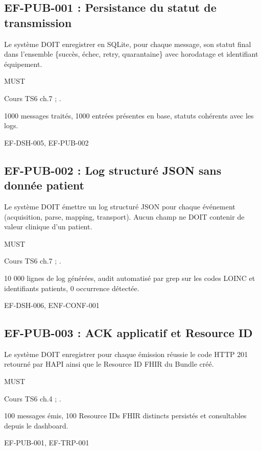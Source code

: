 \subsection*{EF-PUB-001 : Persistance du statut de transmission}
\begin{description}[leftmargin=2.5cm, style=nextline]
  \item[Énoncé] Le système DOIT enregistrer en SQLite, pour chaque message, son statut final dans l'ensemble \{succès, échec, retry, quarantaine\} avec horodatage et identifiant équipement.
  \item[Priorité] MUST
  \item[Source] Cours TS6 ch.7 ; \cite{ihe_pcd_tf}.
  \item[Recette] 1000 messages traités, 1000 entrées présentes en base, statuts cohérents avec les logs.
  \item[Lié à] EF-DSH-005, EF-PUB-002
\end{description}

\subsection*{EF-PUB-002 : Log structuré JSON sans donnée patient}
\begin{description}[leftmargin=2.5cm, style=nextline]
  \item[Énoncé] Le système DOIT émettre un log structuré JSON pour chaque événement (acquisition, parse, mapping, transport). Aucun champ ne DOIT contenir de valeur clinique d'un patient.
  \item[Priorité] MUST
  \item[Source] Cours TS6 ch.7 ; \cite{ihe_pcd_tf}.
  \item[Recette] 10 000 lignes de log générées, audit automatisé par grep sur les codes LOINC et identifiants patients, 0 occurrence détectée.
  \item[Lié à] EF-DSH-006, ENF-CONF-001
\end{description}

\subsection*{EF-PUB-003 : ACK applicatif et Resource ID}
\begin{description}[leftmargin=2.5cm, style=nextline]
  \item[Énoncé] Le système DOIT enregistrer pour chaque émission réussie le code HTTP 201 retourné par HAPI ainsi que le Resource ID FHIR du Bundle créé.
  \item[Priorité] MUST
  \item[Source] Cours TS6 ch.4 ; \cite{hl7_fhir_r4}.
  \item[Recette] 100 messages émis, 100 Resource IDs FHIR distincts persistés et consultables depuis le dashboard.
  \item[Lié à] EF-PUB-001, EF-TRP-001
\end{description}


